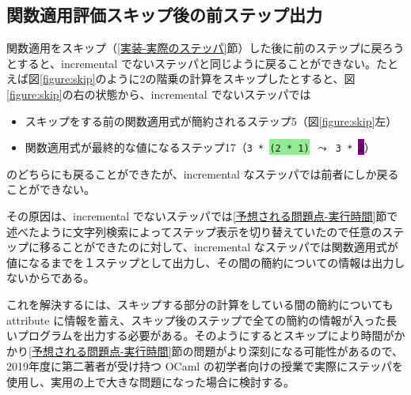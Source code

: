 \subsection{関数適用評価スキップ後の前ステップ出力}

関数適用をスキップ（\ref{実装-実際のステッパ}節）した後に前のステップに戻ろうとすると、incremental でないステッパ\cite{FSA18}と同じように戻ることができない。たとえば図\ref{figure:skip}のように2の階乗の計算をスキップしたとすると、図\ref{figure:skip}の右の状態から、incremental でないステッパでは
\begin{itemize}
\item スキップをする前の関数適用式が簡約されるステップ5（図\ref{figure:skip}左）
\item 関数適用式が最終的な値になるステップ17（\texttt{3 * \colorbox{lightgreen}{(2 * 1)} $\leadsto$ 3 * \colorbox{purple}{2}}）
\end{itemize}
のどちらにも戻ることができたが、incremental なステッパでは前者にしか戻ることができない。

その原因は、incremental でないステッパ\cite{FSA18}では\ref{予想される問題点-実行時間}節で述べたように文字列検索によってステップ表示を切り替えていたので任意のステップに移ることができたのに対して、incremental なステッパでは関数適用式が値になるまでを１ステップとして出力し、その間の簡約についての情報は出力しないからである。

これを解決するには、スキップする部分の計算をしている間の簡約についても attribute に情報を蓄え、スキップ後のステップで全ての簡約の情報が入った長いプログラムを出力する必要がある。そのようにするとスキップにより時間がかかり\ref{予想される問題点-実行時間}節の問題がより深刻になる可能性があるので、2019年度に第二著者が受け持つ OCaml の初学者向けの授業で実際にステッパを使用し、実用の上で大きな問題になった場合に検討する。
